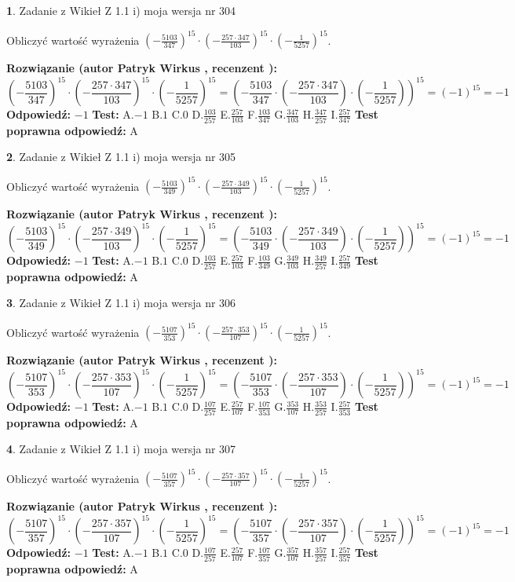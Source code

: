 \documentclass[12pt, a4paper]{article}
\theoremstyle{definition} %
\newtheorem{zad}{}
\newcommand{\zadStart}[1]{\begin{zad}#1\newline}
\newcommand{\zadStop}{\end{zad}}
\newcommand{\rozwStart}[2]{\noindent \textbf{Rozwiązanie (autor #1 , recenzent #2): }\newline}
\newcommand{\rozwStop}{\newline}
\newcommand{\odpStart}{\noindent \textbf{Odpowiedź:}\newline}
\newcommand{\odpStop}{\newline}
\newcommand{\testStart}{\noindent \textbf{Test:}\newline}
\newcommand{\testStop}{\newline}
\newcommand{\kluczStart}{\noindent \textbf{Test poprawna odpowiedź:}\newline}
\newcommand{\kluczStop}{\newline}
\begin{document}
\zadStart{Zadanie z Wikieł Z 1.1 i) moja wersja nr 304}

Obliczyć wartość wyrażenia $(-\frac{5103}{347})^{15} \cdot (-\frac{257 \cdot 347}{103})^{15} \cdot (-\frac{1}{5257})^{15}$.
\zadStop
\rozwStart{Patryk Wirkus}{}
$$(-\frac{5103}{347})^{15} \cdot (-\frac{257 \cdot 347}{103})^{15} \cdot (-\frac{1}{5257})^{15} = (-\frac{5103}{347} \cdot (-\frac{257 \cdot 347}{103}) \cdot (-\frac{1}{5257}))^{15} = (-1)^{15} = -1$$
\rozwStop
\odpStart
$-1$
\odpStop
\testStart
A.$-1$ B.$1$ C.$0$ D.$\frac{103}{257}$ E.$\frac{257}{103}$
F.$\frac{103}{347}$ G.$\frac{347}{103}$
H.$\frac{347}{257}$
I.$\frac{257}{347}$
\testStop
\kluczStart
A
\kluczStop



\zadStart{Zadanie z Wikieł Z 1.1 i) moja wersja nr 305}

Obliczyć wartość wyrażenia $(-\frac{5103}{349})^{15} \cdot (-\frac{257 \cdot 349}{103})^{15} \cdot (-\frac{1}{5257})^{15}$.
\zadStop
\rozwStart{Patryk Wirkus}{}
$$(-\frac{5103}{349})^{15} \cdot (-\frac{257 \cdot 349}{103})^{15} \cdot (-\frac{1}{5257})^{15} = (-\frac{5103}{349} \cdot (-\frac{257 \cdot 349}{103}) \cdot (-\frac{1}{5257}))^{15} = (-1)^{15} = -1$$
\rozwStop
\odpStart
$-1$
\odpStop
\testStart
A.$-1$ B.$1$ C.$0$ D.$\frac{103}{257}$ E.$\frac{257}{103}$
F.$\frac{103}{349}$ G.$\frac{349}{103}$
H.$\frac{349}{257}$
I.$\frac{257}{349}$
\testStop
\kluczStart
A
\kluczStop



\zadStart{Zadanie z Wikieł Z 1.1 i) moja wersja nr 306}

Obliczyć wartość wyrażenia $(-\frac{5107}{353})^{15} \cdot (-\frac{257 \cdot 353}{107})^{15} \cdot (-\frac{1}{5257})^{15}$.
\zadStop
\rozwStart{Patryk Wirkus}{}
$$(-\frac{5107}{353})^{15} \cdot (-\frac{257 \cdot 353}{107})^{15} \cdot (-\frac{1}{5257})^{15} = (-\frac{5107}{353} \cdot (-\frac{257 \cdot 353}{107}) \cdot (-\frac{1}{5257}))^{15} = (-1)^{15} = -1$$
\rozwStop
\odpStart
$-1$
\odpStop
\testStart
A.$-1$ B.$1$ C.$0$ D.$\frac{107}{257}$ E.$\frac{257}{107}$
F.$\frac{107}{353}$ G.$\frac{353}{107}$
H.$\frac{353}{257}$
I.$\frac{257}{353}$
\testStop
\kluczStart
A
\kluczStop



\zadStart{Zadanie z Wikieł Z 1.1 i) moja wersja nr 307}

Obliczyć wartość wyrażenia $(-\frac{5107}{357})^{15} \cdot (-\frac{257 \cdot 357}{107})^{15} \cdot (-\frac{1}{5257})^{15}$.
\zadStop
\rozwStart{Patryk Wirkus}{}
$$(-\frac{5107}{357})^{15} \cdot (-\frac{257 \cdot 357}{107})^{15} \cdot (-\frac{1}{5257})^{15} = (-\frac{5107}{357} \cdot (-\frac{257 \cdot 357}{107}) \cdot (-\frac{1}{5257}))^{15} = (-1)^{15} = -1$$
\rozwStop
\odpStart
$-1$
\odpStop
\testStart
A.$-1$ B.$1$ C.$0$ D.$\frac{107}{257}$ E.$\frac{257}{107}$
F.$\frac{107}{357}$ G.$\frac{357}{107}$
H.$\frac{357}{257}$
I.$\frac{257}{357}$
\testStop
\kluczStart
A
\kluczStop
\end{document}
